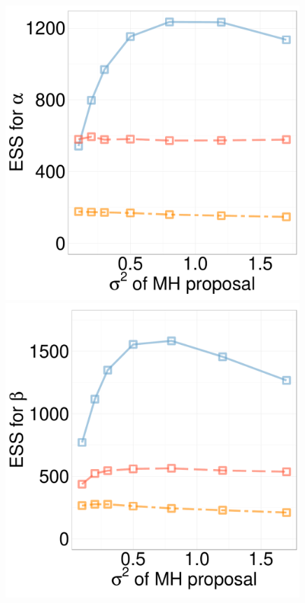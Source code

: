   \begin{figure}[H]
  \centering
  \begin{minipage}[!hp]{0.24\linewidth}
  \centering
    \includegraphics [width=0.99\textwidth, angle=0]{figs/ess/EXP_D3alpha_k2.pdf}
\end{minipage}
  \begin{minipage}[hp]{0.24\linewidth}
  \centering
    \includegraphics [width=0.99\textwidth, angle=0]{figs/ess/EXP_D3beta_k2.pdf}

\end{minipage}
\end{figure}
